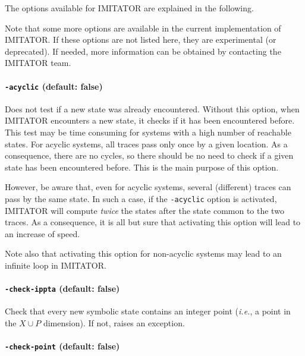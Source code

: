 \documentclass[a4paper,11pt]{report}
\makeatletter
\newcommand{\Clock}{X} %
\newcommand{\Param}{P} %
\newcommand{\imitator}{\textsf{IMITATOR}}
\newcommand{\styleOption}[1]{\textcolor{optioncolor}{\texttt{#1}}}
\newcommand{\ie}{\textcolor{colorok}{\textit{i.e.},\@}}
\makeatother
\begin{document}
The options available for \imitator{} are explained in the following.

Note that some more options are available in the current implementation of \imitator{}.
If these options are not listed here, they are experimental (or deprecated).
If needed, more information can be obtained by contacting the \imitator{} team.


\paragraph{\styleOption{-acyclic} (default: false)}
Does not test if a new state was already encountered.
Without this option, when \imitator{} encounters a new state, it checks if it has been encountered before.
This test may be time consuming for systems with a high number of reachable states.
For acyclic systems, all traces pass only once by a given location.
As a consequence, there are no cycles, so there should be no need to check if a given state has been encountered before.
This is the main purpose of this option.

However, be aware that, even for acyclic systems, several (different) traces can pass by the same state.
In such a case, if the \styleOption{-acyclic} option is activated, \imitator{} will compute \emph{twice} the states after the state common to the two traces.
As a consequence, it is all but sure that activating this option will lead to an increase of speed.

Note also that activating this option for non-acyclic systems may lead to an infinite loop in \imitator{}.


\paragraph{\styleOption{-check-ippta} (default: false)}

Check that every new symbolic state contains an integer point (\ie{} a point in the $\Clock \cup \Param$ dimension).
If not, raises an exception.


\paragraph{\styleOption{-check-point} (default: false)}
\end{document}
